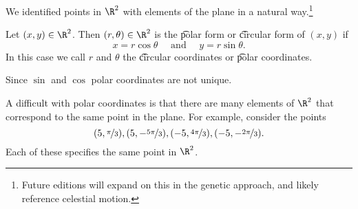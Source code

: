 

We identified points in $\R^2$ with elements of the plane in a natural way.\footnote{Future editions will expand on this in the genetic approach, and likely reference celestial motion.}


Let $(x, y) \in \R^2$.
Then $(r, \theta) \in \R^2$ is the \t{polar form} or \t{circular form} of $(x, y)$ if
\[
  x = r \cos \theta \quad \text{ and } \quad y = r \sin \theta .
\]
In this case we call $r$ and $\theta$ the \t{circular coordinates} or \t{polar coordinates}.

Since $\sin$ and $\cos$ polar coordinates are not unique.



A difficult with polar coordinates is that there are many elements of $\R^2$ that correspond to the same point in the plane.
For example, consider the points
\[
  (5, \nicefrac{\pi}{3}), (5, -\nicefrac{5\pi}{3}), (-5, \nicefrac{4\pi}{3}), (-5, -\nicefrac{2\pi}{3}).
\]
Each of these specifies the same point in $\R^2$.


\blankpage
